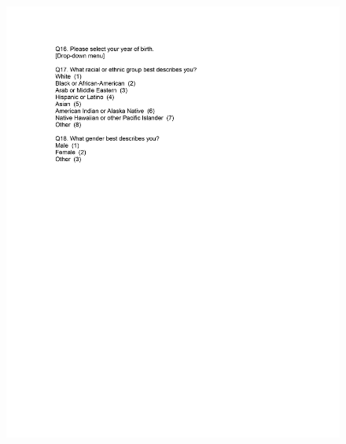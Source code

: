 \documentclass[12pt,econ]{sources/authesis}
\makeatletter
\def\maxwidth{\ifdim\Gin@nat@width>\linewidth\linewidth
\else\Gin@nat@width\fi}
\let\Oldincludegraphics\includegraphics
\renewcommand{\includegraphics}[1]{\Oldincludegraphics[width=\maxwidth]{#1}}
\makeatother
\begin{document}
\begin{figure}[hbt]
  \centering
\includegraphics{data/framing/appendix/questionnaire/questionnaire09.jpg}
\end{figure}
\end{document}
